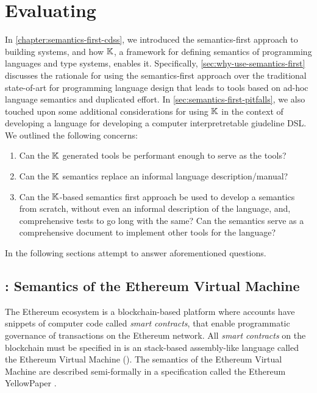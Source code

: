 \chapter{Evaluating \K{}}\label{chapter:evaluating-k}

In \autoref{chapter:semantics-first-cdss}, we introduced the
semantics-first approach to building systems, and how $\mathbb{K}$,
a framework for defining semantics of programming languages and
type systems, enables it. Specifically, \autoref{sec:why-use-semantics-first}
discusses the rationale for using the semantics-first approach over
the traditional state-of-art for programming language design that
leads to tools based on ad-hoc language semantics and duplicated effort.
In \autoref{sec:semantics-first-pitfalls}, we also touched upon
some additional considerations for using $\mathbb{K}$ in the context of
developing a language for developing a computer interpretretable giudeline DSL.
We outlined the following concerns:
\begin{enumerate}[label=(Q\arabic*)]
 \item Can the $\mathbb{K}$ generated tools be performant enough to serve as
 the  tools?
 \item Can the $\mathbb{K}$ semantics replace an informal language description/manual?
 \item Can the $\mathbb{K}$-based semantics first approach be used to develop
 a semantics from scratch, without even an informal description of the language,
  and, comprehensive tests to go long with the same? Can the semantics
  serve as a comprehensive document to implement other tools for the language?
\end{enumerate}
In the following sections attempt to answer aforementioned questions.

\section{\KEVM: Semantics of the Ethereum Virtual Machine}\label{sec:kevm}

The Ethereum ecosystem is a blockchain-based platform where accounts
have snippets of computer code called \emph{smart contracts}, that
enable programmatic governance of transactions on the Ethereum network.
All \emph{smart contracts} on the blockchain
must be specified in is an stack-based assembly-like language called
the Ethereum Virtual Machine (\EVM{}). The semantics of the
Ethereum Virtual Machine are described semi-formally in a specification
called the Ethereum YellowPaper \cite{WoodReport14}.

